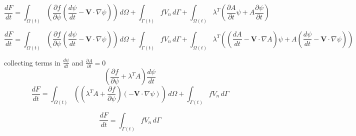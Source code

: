 \documentclass{tufte-handout}
\begin{document}
\begin{equation}
\frac{d F}{d t} =  \int_{\Omega(t)} \left(\frac{\partial f}{\partial \psi}  \left(  \frac{d \psi}{d t}
- \boldsymbol{V}  \cdot \nabla \psi \right) 
\right)   \,  d\Omega + 
\int_{\Gamma(t)}  f V_n \,  d\Gamma +  \int_{\Omega(t)} \lambda^T \left( \frac{\partial A}{\partial t} \psi + A \frac{\partial \psi}{\partial t} \right) 
\end{equation}


\begin{equation}
\frac{d F}{d t} =  \int_{\Omega(t)} \left(\frac{\partial f}{\partial \psi}  \left(  \frac{d \psi}{d t}
- \boldsymbol{V}  \cdot \nabla \psi \right) 
 \right)   \,  d\Omega + 
 \int_{\Gamma(t)}  f V_n \,  d\Gamma +  \int_{\Omega(t)} \lambda^T \left(  \left(  \frac{d A}{d t}
 - \boldsymbol{V}  \cdot \nabla A \right)  \psi + A \left(  \frac{d \psi}{d t}
 - \boldsymbol{V}  \cdot \nabla \psi \right) \right) 
\end{equation}

collecting terms in $\frac{d \psi}{d t}$ and $\frac{\partial A}{\partial t} = 0$
\begin{equation}
\left(\frac{\partial f}{\partial \psi} + \lambda^T A \right) \frac{d \psi}{d t}
\end{equation}
\begin{equation}
\frac{d F}{d t} =  \int_{\Omega(t)} \left(\left( \lambda^T A  + \frac{ \partial f}{\partial \psi}\right)   \left( 
- \boldsymbol{V}  \cdot \nabla \psi \right) 
\right)   \,  d\Omega + 
\int_{\Gamma(t)}  f V_n \,  d\Gamma  
\end{equation}



\begin{equation}
\frac{d F}{d t} =  \int_{\Gamma(t)}  f V_n \,  d\Gamma  
\end{equation}
	
\end{document}
